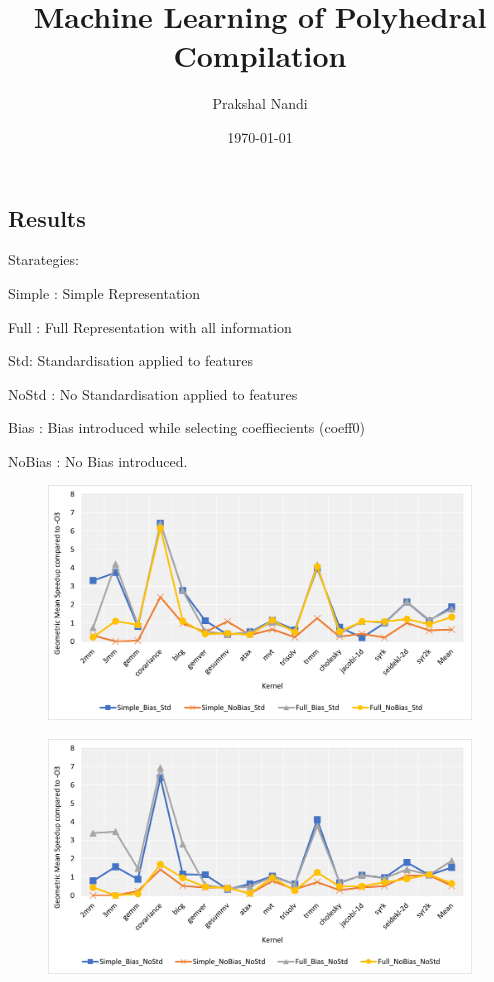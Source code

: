 \documentclass[logo,msc]{infthesis}           %
\begin{document}
\begin{preliminary}

\title{Machine Learning of Polyhedral Compilation}

\author{Prakshal Nandi}

\date{\today}



\chapter{Results}

Starategies:

Simple : Simple Representation

Full : Full Representation with all information

Std: Standardisation applied to features

NoStd : No Standardisation applied to features

Bias : Bias introduced while selecting coeffiecients (coeff0)

NoBias : No Bias introduced.

\begin{figure}
\centering
\begin{minipage}{.45\linewidth}
  \includegraphics[width=\linewidth]{Images/Std_Chart.png}
  \label{Std_Chart}
\end{minipage}
\hspace{.05\linewidth}
\begin{minipage}{.45\linewidth}
  \includegraphics[width=\linewidth]{Images/NoStd_Chart.png}
  \label{NoStd_Chart}
\end{minipage}
\end{figure}


\end{preliminary}
\end{document}
